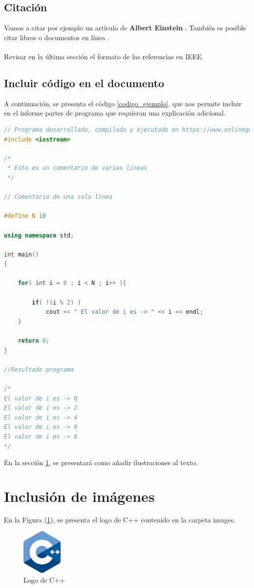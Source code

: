 \documentclass{article}
\begin{document}
\subsection{Citación}
Vamos a citar por ejemplo un artículo de \textbf{Albert Einstein} \cite{einstein}.
También es posible citar libros \cite{dirac} o documentos en línea \cite{knuthwebsite}.\\\\
Revisar en la última sección el formato de las referencias en IEEE.

\subsection{Incluir código en el documento}
%
A continuación, se presenta el código \ref{codigo_ejemplo}, que nos permite incluir en el informe partes de programa que requieran una explicación adicional.
\begin{lstlisting}[language=C++, label=codigo_ejemplo]
// Programa desarrollado, compilado y ejecutado en https://www.onlinegdb.com
#include <iostream>

/*
 * Esto es un comentario de varias lineas
 */

// Comentario de una sola linea

#define N 10

using namespace std;

int main()
{
    
    for( int i = 0 ; i < N ; i++ ){
        
        if( !(i % 2) )
            cout << " El valor de i es -> " << i << endl;
    }
    
    return 0;
}

//Resultado programa

/*
El valor de i es -> 0
El valor de i es -> 2
El valor de i es -> 4
El valor de i es -> 6
El valor de i es -> 8
*/
\end{lstlisting}
En la sección \ref{imagenes}, se presentará como añadir ilustraciones al texto.

\section{Inclusión de imágenes} \label{imagenes}

En la Figura (\ref{fig:cpplogo}), se presenta el logo de C++ contenido en la carpeta images.

\begin{figure}[h]
\includegraphics[width=2cm]{cpplogo.png}
\centering
\caption{Logo de C++}
\label{fig:cpplogo}
\end{figure}
\end{document}
